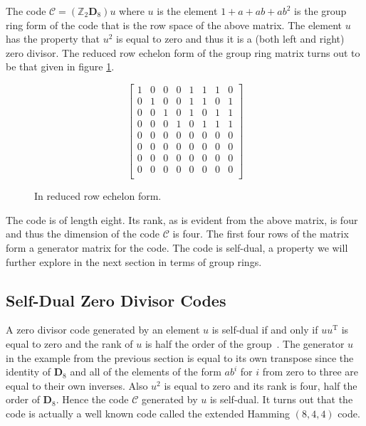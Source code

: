 The code $\mathcal{C} = (\mathbb{Z}_2 \mathbf{D}_8)u$ where $u$ is the element $1+a+ab+ab^2$ is the group ring form of the code that is the row space of the above matrix.
The element $u$ has the property that $u^2$ is equal to zero and thus it is a (both left and right) zero divisor.
The reduced row echelon form of the group ring matrix turns out to be that given in figure \ref{fig:rrefrgmatz2d8}.
\begin{figure}[htbp]
\begin{center}
\[ \left[ \begin{array}{cccccccc}
1 & 0 & 0 & 0 & 1 & 1 & 1 & 0 \\
0 & 1 & 0 & 0 & 1 & 1 & 0 & 1 \\
0 & 0 & 1 & 0 & 1 & 0 & 1 & 1 \\
0 & 0 & 0 & 1 & 0 & 1 & 1 & 1 \\
0 & 0 & 0 & 0 & 0 & 0 & 0 & 0 \\
0 & 0 & 0 & 0 & 0 & 0 & 0 & 0 \\
0 & 0 & 0 & 0 & 0 & 0 & 0 & 0 \\
0 & 0 & 0 & 0 & 0 & 0 & 0 & 0 \\
\end{array} \right] \]
\caption{In reduced row echelon form.}
\label{fig:rrefrgmatz2d8}
\end{center}
\end{figure}
The code is of length eight.
Its rank, as is evident from the above matrix, is four and thus the dimension of the code $\mathcal{C}$ is four.
The first four rows of the matrix form a generator matrix for the code.
The code is self-dual, a property we will further explore in the next section in terms of group rings.

\subsection{Self-Dual Zero Divisor Codes}
\label{sect:selfdualzdcodes}
A zero divisor code generated by an element $u$ is self-dual if and only if $uu^{\textrm{T}}$ is equal to zero and the rank of $u$ is half the order of the group~\cite{hur07,hur09}.
The generator $u$ in the example from the previous section is equal to its own transpose since the identity of $\mathbf{D}_8$ and all of the elements of the form $ab^i$ for $i$ from zero to three are equal to their own inverses.
Also $u^2$ is equal to zero and its rank is four, half the order of $\mathbf{D}_8$.
Hence the code $\mathcal{C}$ generated by $u$ is self-dual.
It turns out that the code is actually a well known code called the extended Hamming $(8,4,4)$ code.

